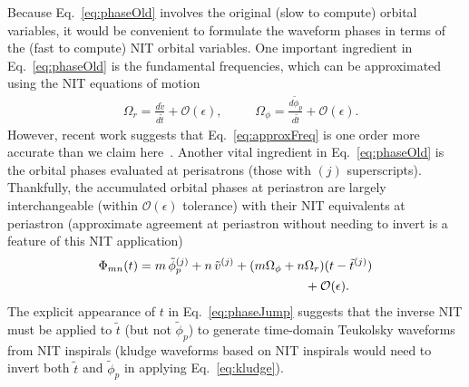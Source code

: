 \documentclass[aps,prd,twocolumn,showpacs,notitlepage,eqsecnum,
superscriptaddress,nofootinbib]{revtex4-1}
\begin{document}
Because Eq.~\eqref{eq:phaseOld} involves the original (slow to compute) orbital variables, it would be convenient to formulate the waveform phases in terms of the (fast to compute) NIT orbital variables. One important ingredient in Eq.~\eqref{eq:phaseOld} is the fundamental frequencies, which can be approximated using the NIT equations of motion
\begin{align}
\label{eq:approxFreq}
&\Omega_r = \frac{d\tilde{v}}{d\tilde{t}} + \mathcal{O}(\epsilon) , \qquad\;\; \Omega_\phi = \frac{d\tilde{\phi}_p}{d\tilde{t}}  + \mathcal{O}(\epsilon) .
\end{align}
However, recent work suggests that Eq.~\eqref{eq:approxFreq} is one order more accurate than we claim here~\cite{Lynch}. Another vital ingredient in Eq.~\eqref{eq:phaseOld} is the orbital phases evaluated at perisatrons (those with $(j)$ superscripts). Thankfully, the accumulated orbital phases at periastron are largely interchangeable (within $\mathcal{O}(\epsilon)$ tolerance) with their NIT equivalents at periastron (approximate agreement at periastron without needing to invert is a feature of this NIT application)
\begin{align}
\Phi_{mn}(t) = m\, \tilde{\phi}^{(j)}_p + n\, \tilde{v}^{(j)} + (m\Omega_\phi  + n & \Omega_r)(t-\tilde{t}^{(j)}) \notag
\\ & + \mathcal{O}(\epsilon).
\label{eq:phaseJump}
\end{align}
The explicit appearance of $t$ in Eq.~\eqref{eq:phaseJump} suggests that the inverse NIT must be applied to $\tilde{t}$ (but not $\tilde{\phi}_p$) to generate time-domain Teukolsky waveforms from NIT inspirals (kludge waveforms based on NIT inspirals would need to invert both $\tilde{t}$ and $\tilde{\phi}_p$ in applying Eq.~\eqref{eq:kludge}).
\end{document}
